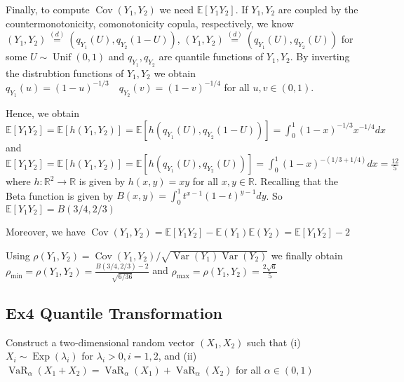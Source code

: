 Finally, to compute $\operatorname{Cov}\left(Y_{1}, Y_{2}\right)$ we need $\mathbb{E}\left[Y_{1} Y_{2}\right]$. If $Y_{1}, Y_{2}$ are coupled by the countermonotonicity, comonotonicity copula, respectively, we know $\left(Y_{1}, Y_{2}\right) \stackrel{(d)}{=}\left(q_{Y_{1}}(U), q_{Y_{2}}(1-U)\right)$, $\left(Y_{1}, Y_{2}\right) \stackrel{(d)}{=}\left(q_{Y_{1}}(U), q_{Y_{2}}(U)\right)$ for some $U \sim \operatorname{Unif}(0,1)$ and $q_{Y_{1}}, q_{Y_{2}}$ are quantile functions of $Y_{1}, Y_{2}$. By inverting the distrubtion functions of $Y_{1}, Y_{2}$ we obtain
$
q_{Y_{1}}(u)=(1-u)^{-1 / 3} \quad q_{Y_{2}}(v)=(1-v)^{-1 / 4}
$
for all $u, v \in(0,1)$. 

Hence, we obtain
$
\mathbb{E}\left[Y_{1} Y_{2}\right]=\mathbb{E}\left[h\left(Y_{1}, Y_{2}\right)\right]=\mathbb{E}\left[h\left(q_{Y_{1}}(U), q_{Y_{2}}(1-U)\right)\right]=\int_{0}^{1}(1-x)^{-1 / 3} x^{-1 / 4} d x
$
and
$
\mathbb{E}\left[Y_{1} Y_{2}\right]=\mathbb{E}\left[h\left(Y_{1}, Y_{2}\right)\right]=\mathbb{E}\left[h\left(q_{Y_{1}}(U), q_{Y_{2}}(U)\right)\right]=\int_{0}^{1}(1-x)^{-(1 / 3+1 / 4)} d x=\frac{12}{5}
$
where $h: \mathbb{R}^{2} \rightarrow \mathbb{R}$ is given by $h(x, y)=x y$ for all $x, y \in \mathbb{R}$. Recalling that the Beta function is given by $B(x, y)=\int_{0}^{1} t^{x-1}(1-t)^{y-1} d y$. So
$
\mathbb{E}\left[Y_{1} Y_{2}\right]=B(3 / 4,2 / 3)
$

Moreover, we have
$
\operatorname{Cov}\left(Y_{1}, Y_{2}\right)=\mathbb{E}\left[Y_{1} Y_{2}\right]-\mathbb{E}(Y_1)\mathbb{E}(Y_2)=\mathbb{E}\left[Y_{1} Y_{2}\right]-2
$

Using $\rho\left(Y_{1}, Y_{2}\right)=\operatorname{Cov}\left(Y_{1}, Y_{2}\right) / \sqrt{\operatorname{Var}\left(Y_{1}\right) \operatorname{Var}\left(Y_{2}\right)}$ we finally obtain
$
\rho_{\min }=\rho\left(Y_{1}, Y_{2}\right)=\frac{B(3 / 4,2 / 3)-2}{\sqrt{6 / 36}}
$
and
$
\rho_{\max }=\rho\left(Y_{1}, Y_{2}\right)=\frac{2 \sqrt{6}}{5}
$



\subsection*{Ex4 Quantile Transformation}
Construct a two-dimensional random vector $\left(X_{1}, X_{2}\right)$ such that
(i) $X_{i} \sim \operatorname{Exp}\left(\lambda_{i}\right)$ for $\lambda_{i}>0, i=1,2$, and
(ii) $\operatorname{VaR}_{\alpha}\left(X_{1}+X_{2}\right)=\operatorname{VaR}_{\alpha}\left(X_{1}\right)+\operatorname{VaR}_{\alpha}\left(X_{2}\right)$ for all $\alpha \in(0,1)$

